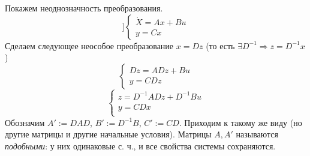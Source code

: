 \documentclass[main.tex]{subfiles}
\begin{document}
Покажем неоднозначность преобразования.
\[ ] \begin{cases}
    \dot X = Ax + Bu \\
    y = Cx
\end{cases} \]
Сделаем следующее неособое преобразование $ x = Dz $ (то есть $ \exists D^{-1} \Rightarrow z = D^{-1}x $)
\[ \begin{cases}
    D \dot z = ADz + Bu \\
    y = CDz
\end{cases} \]
\[ \begin{cases}
    z = D^{-1}ADz + D^{-1}Bu \\
    y = CDx \\
\end{cases} \]
Обозначим $ A' := DAD $, $ B':=D^{-1}B $, $C' := CD$.
Приходим к такому же виду (но другие матрицы и другие начальные условия).
Матрицы $ A, A' $ называются \emph{подобными}: у них одинаковые с. ч., и все свойства системы сохраняются. \\
\end{document}
